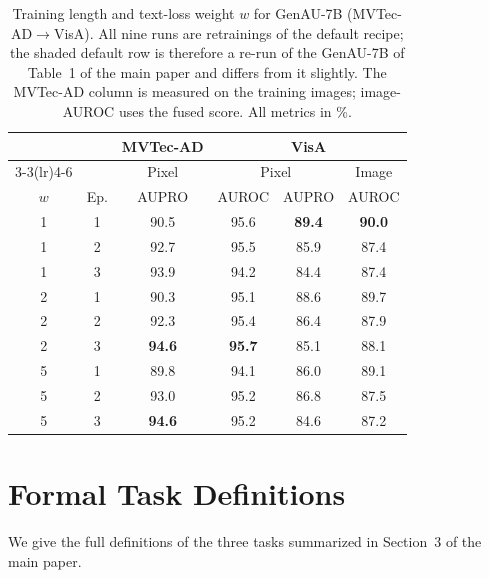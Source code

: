 \begin{table}[t]
\centering
\small
\setlength{\tabcolsep}{3pt}
\caption{Training length and text-loss weight $w$ for GenAU-7B (MVTec-AD$\rightarrow$VisA). All nine runs are retrainings of the default recipe; the shaded default row is therefore a re-run of the GenAU-7B of Table~1 of the main paper and differs from it slightly. The MVTec-AD column is measured on the training images; image-AUROC uses the fused score. All metrics in \%.}
\label{tab:epochs}
\begin{tabular}{@{}cc|c|cc|c@{}}
\toprule
 & & \textbf{MVTec-AD} & \multicolumn{3}{c}{\textbf{VisA}} \\
\cmidrule(lr){3-3}\cmidrule(lr){4-6}
 & & Pixel & \multicolumn{2}{c|}{Pixel} & Image \\
$w$ & Ep. & AUPRO & AUROC & AUPRO & AUROC \\
\midrule
\rowcolor{gray!20}
1 & 1 & 90.5 & 95.6 & \textbf{89.4} & \textbf{90.0} \\
1 & 2 & 92.7 & 95.5 & 85.9 & 87.4 \\
1 & 3 & 93.9 & 94.2 & 84.4 & 87.4 \\
\midrule
2 & 1 & 90.3 & 95.1 & 88.6 & 89.7 \\
2 & 2 & 92.3 & 95.4 & 86.4 & 87.9 \\
2 & 3 & \textbf{94.6} & \textbf{95.7} & 85.1 & 88.1 \\
\midrule
5 & 1 & 89.8 & 94.1 & 86.0 & 89.1 \\
5 & 2 & 93.0 & 95.2 & 86.8 & 87.5 \\
5 & 3 & \textbf{94.6} & 95.2 & 84.6 & 87.2 \\
\bottomrule
\end{tabular}
\end{table}

\section{Formal Task Definitions}
\label{app:tasks}
We give the full definitions of the three tasks summarized in Section~3 of the main paper.

